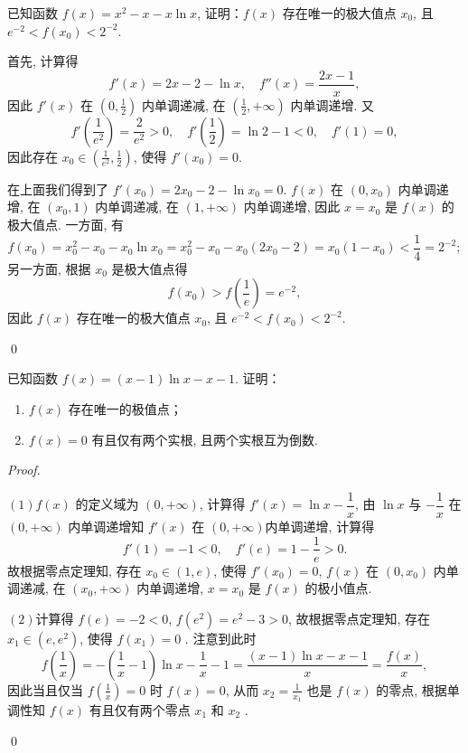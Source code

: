 \begin{example}[2017年II卷理]
    已知函数 $f(x) = x^2 - x - x\ln x$, 证明：$f(x)$ 存在唯一的极大值点 $x_0$, 且 $e^{-2} < f(x_0) < 2^{-2}$. 
\end{example}
\begin{jie}
    首先, 计算得
    \[
    f'(x) = 2x - 2 - \ln x, \quad f''(x) = \frac{2x - 1}{x},
    \]
    因此 $f'(x)$ 在 $\left(0, \frac{1}{2}\right)$ 内单调递减, 在 $\left(\frac{1}{2}, +\infty\right)$ 内单调递增. 又
    \[
    f'\left(\frac{1}{e^2}\right) = \frac{2}{e^2} > 0, \quad f'\left(\frac{1}{2}\right) = \ln 2 - 1 < 0, \quad f'(1) = 0,
    \]
    因此存在 $x_0 \in \left(\frac{1}{e^2}, \frac{1}{2}\right)$, 使得 $f'(x_0) = 0$. 
    
    在上面我们得到了 $f'(x_0) = 2x_0 - 2 - \ln x_0 = 0$. $f(x)$ 在 $(0, x_0)$ 内单调递增, 在 $(x_0, 1)$ 内单调递减, 在 $(1, +\infty)$ 内单调递增, 因此 $x = x_0$ 是 $f(x)$ 的极大值点. 一方面, 有
    \[
    f(x_0) = x_0^2 - x_0 - x_0\ln x_0 = x_0^2 - x_0 - x_0(2x_0 - 2) = x_0(1 - x_0) < \frac{1}{4} = 2^{-2};
    \]
    另一方面, 根据 $x_0$ 是极大值点得
    \[
    f(x_0) > f\left(\frac{1}{e}\right) = e^{-2},
    \]
    因此 $f(x)$ 存在唯一的极大值点 $x_0$, 且 $e^{-2} < f(x_0) < 2^{-2}$. 








    \qed
\end{jie}
\begin{exercise}[2019年II卷文数]
    已知函数 $f(x) = (x-1)\ln x - x - 1$. 证明：
\begin{enumerate}
    \item $f(x)$ 存在唯一的极值点；
    \item $f(x) = 0$ 有且仅有两个实根, 且两个实根互为倒数. 
\end{enumerate}

\end{exercise}

\begin{proof}
\ 

\((1)\)$f(x)$ 的定义域为 $(0, +\infty)$, 计算得 $f'(x) = \ln x - \dfrac{1}{x}$, 由 $\ln x$ 与 $-\dfrac{1}{x}$ 在 $(0, +\infty)$ 内单调递增知 $f'(x)$ 在 $(0, +\infty)$内单调递增, 计算得
        \[ f'(1) = -1 < 0,  \quad f'(e) = 1 - \frac{1}{e} > 0. \]
     故根据零点定理知, 存在 $x_0 \in (1, e)$, 使得 $f'(x_0) = 0$, $f(x)$ 在 $(0, x_0)$ 内单调递减, 在 $(x_0, +\infty)$ 内单调递增, $x = x_0$ 是 $f(x)$
     的极小值点. 

\((2)\)计算得 $f(e) = -2 < 0$, $f(e^2) = e^2 - 3 > 0$, 故根据零点定理知, 存在 $x_1 \in (e, e^2)$, 使得 $f(x_1) = 0$
    . 注意到此时
        \[
        f
    \left(\frac{1}{x}\right) = -\left(\frac{1}{x} - 1\right)\ln x - \frac{1}{x} - 1 = \frac{(x-1)\ln x - x - 1}{x} = \frac
    {f(x)}{x},
        \]
        因此当且仅当 
    $f\left(\frac{1}{x}\right) = 0$ 时 $f(x) = 0$, 从而 $x_2 = \frac{1}{x_1}$ 也是 $f(x)$ 的零点, 根据单调性知 $f(x)$ 有且仅有两个零点 $x_1$ 和 $x_2$
    . 

    \qed
\end{proof}

